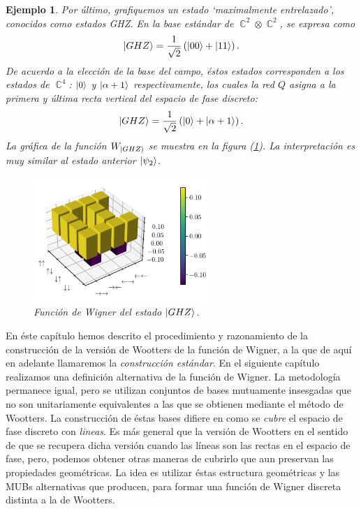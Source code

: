 \documentclass[a4paper,11pt]{report}
\DeclareMathOperator{\C}{\mathbb{C}}
\newtheorem{example}{Ejemplo}
\begin{document}
\begin{example}
    Por último, grafiquemos un estado `maximalmente
    entrelazado', conocidos como estados GHZ. En la base
    estándar de $\C^2 \otimes \C^2$, se expresa como
    \[
      \ket{GHZ}
      = \frac{1}{\sqrt{2}} \left( \ket{00} + \ket{11}
      \right). 
    \] 
    De acuerdo a la elección de la base del campo, éstos
    estados corresponden a los estados de $\C^{4}$: $\ket{0}$
    y $\ket{\alpha+1}$ respectivamente, los cuales la red
    $Q$ asigna a la primera y última recta vertical del
    espacio de fase discreto:
    \[
      \ket{GHZ}
      = \frac{1}{\sqrt{2}}
      \left( \ket{0} + \ket{\alpha+1} \right). 
    \] 
    La gráfica de la función $W_{\ket{GHZ}}$ se muestra en
    la figura (\ref{fig:wigner-desargues-2-2-ghz}). La
    interpretación es muy similar al estado anterior
    $\ket{\psi_2}$.
    \begin{figure}[ht]
      \centering
      \includegraphics[width=0.6\textwidth]{
      imgs/wigner-desargues-2-2-ghz.png}
      \caption{Función de Wigner del estado $\ket{GHZ}$.}
      \label{fig:wigner-desargues-2-2-ghz}
    \end{figure}
  \end{example}

  En éste capítulo hemos descrito el procedimiento y
  razonamiento de la construcción de la versión de Wootters
  de la función de Wigner, a la que de aquí en adelante
  llamaremos la \textit{construcción estándar}. En el
  siguiente capítulo realizamos una definición alternativa
  de la función de Wigner. La metodología permanece igual,
  pero se utilizan conjuntos de bases mutuamente insesgadas
  que no son unitariamente equivalentes a las que se
  obtienen mediante el método de Wootters. La construcción
  de éstas bases difiere en como se \textit{cubre} el
  espacio de fase discreto con \textit{lineas}. Es más
  general que la versión de Wootters en el sentido de que se
  recupera dicha versión cuando las líneas son las rectas en
  el espacio de fase, pero, podemos obtener otras maneras de
  cubrirlo que aun preservan las propiedades geométricas. La
  idea es utilizar éstas estructura geométricas y las MUBs
  alternativas que producen, para formar una función de
  Wigner discreta distinta a la de Wootters.
\end{document}
